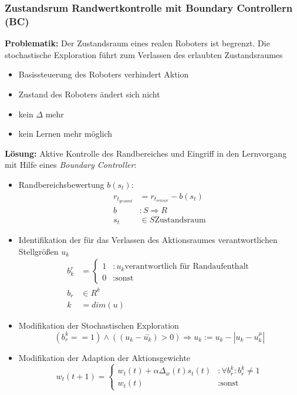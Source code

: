 \subsubsection{Zustandsrum Randwertkontrolle mit Boundary Controllern (BC)}
\textbf{Problematik:} Der Zustandsraum eines realen Roboters ist begrenzt. Die stochastische Exploration führt zum Verlassen des erlaubten Zustandsraumes
\begin{itemize}
	\item Basissteuerung des Roboters verhindert Aktion
	\item Zustand des Roboters ändert sich nicht
	\item kein $\Delta$ mehr
	\item kein Lernen mehr möglich
\end{itemize}
\textbf{Lösung:} Aktive Kontrolle des Randbereiches und Eingriff in den Lernvorgang mit Hilfe eines \emph{Boundary Controller}:
\begin{itemize}
	\item Randbereichsbewertung $b(s_t)$:
	\begin{align*}
		r_{t_{gesamt}} &= r_{t_{sensor}} - b(s_t) \\
		b &: S \Rightarrow R \\
		s_t & \in S \text{Zustandsraum}
	\end{align*}
	\item Identifikation der für das Verlassen des Aktionsraumes verantwortlichen Stellgrößen $u_k$
	\begin{align*}
		b_k^r &=
		\begin{cases}
			1 &: u_k \text{verantwortlich für Randaufenthalt} \\
			0 &: \text{sonst}
		\end{cases} \\
		b_r & \in R^k \\
		k &= dim(u)
	\end{align*}
	\item Modifikation der Stochastischen Exploration
	\begin{equation*}
		(b_r^k == 1) \wedge ((u_k - \overset{-}{u_k}) > 0) \Rightarrow u_k := u_k - |u_k - u_k^{\mu}|
	\end{equation*}
	\item Modifikation der Adaption der Aktionsgewichte
	\begin{equation*}
		w_t(t+1) =
		\begin{cases}
			w_t(t) + \alpha \Delta_w(t)s_t(t) &: \forall b_r^k : b_r^k \neq 1 \\
			w_t(t) &: \text{sonst}
		\end{cases}
	\end{equation*}
\end{itemize}

